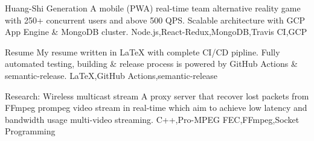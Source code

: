 \begin{projects}
  \project
  {Huang-Shi Generation}{}
  {}
  {A mobile (PWA) real-time team alternative reality game with 250+ concurrent users and above 500 QPS. Scalable architecture with GCP App Engine \& MongoDB cluster.}
  {Node.js,React-Redux,MongoDB,Travis CI,GCP}

  \project
  {Resume}{}
  {}
  {My resume written in LaTeX with complete CI/CD pipline. Fully automated testing, building \& release process is powered by GitHub Actions \& semantic-release.}
  {LaTeX,GitHub Actions,semantic-release}

  \project
  {Research: Wireless multicast stream}{}
  {}
  {A proxy server that recover lost packets from FFmpeg prompeg video stream in real-time which aim to achieve low latency and bandwidth usage multi-video streaming.}
  {C++,Pro-MPEG FEC,FFmpeg,Socket Programming}

\end{projects}
